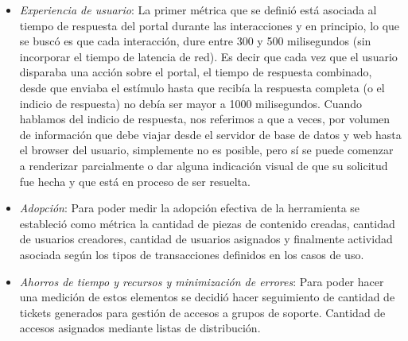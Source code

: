 \begin{itemize}
    \item \textit{Experiencia de usuario}:
	La primer métrica que se definió está asociada al tiempo de respuesta del portal durante las interacciones y en principio, lo que se buscó es que cada interacción, dure entre 300 y 500 milisegundos (sin incorporar el tiempo de latencia de red). Es decir que cada vez que el usuario disparaba una acción sobre el portal, el tiempo de respuesta combinado, desde que enviaba el estímulo hasta que recibía la respuesta completa (o el indicio de respuesta) no debía ser mayor a 1000 milisegundos. Cuando hablamos del indicio de respuesta, nos referimos a que a veces, por volumen de información que debe viajar desde el servidor de base de datos y web hasta el browser del usuario, simplemente no es posible, pero sí se puede comenzar a renderizar parcialmente o dar alguna indicación visual de que su solicitud fue hecha y que está en proceso de ser resuelta.

    \item \textit{Adopción}: Para poder medir la adopción efectiva de la herramienta se estableció como métrica la cantidad de piezas de contenido creadas, cantidad de usuarios creadores, cantidad de usuarios asignados y finalmente actividad asociada según los tipos de transacciones definidos en los casos de uso.

    \item \textit{Ahorros de tiempo y recursos y minimización de errores}:
Para poder hacer una medición de estos elementos se decidió hacer seguimiento de cantidad de tickets generados para gestión de accesos a grupos de soporte. Cantidad de accesos asignados mediante listas de distribución.
\end{itemize}
